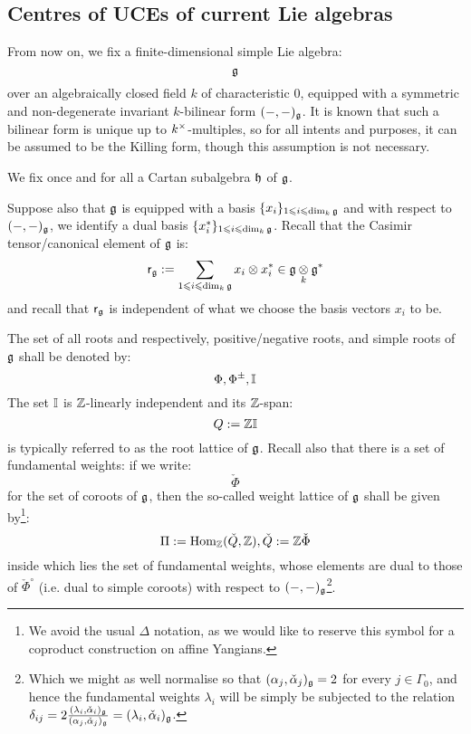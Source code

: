     \subsection{Centres of UCEs of current Lie algebras}
        \begin{convention} \label{conv: a_fixed_finite_dimensional_simple_lie_algebra}
            From now on, we fix a finite-dimensional simple Lie algebra:
                $$\mathfrak{g}$$
            over an algebraically closed field $k$ of characteristic $0$, equipped with a symmetric and non-degenerate invariant $k$-bilinear form $(-, -)_{\mathfrak{g}}$. It is known that such a bilinear form is unique up to $k^{\x}$-multiples, so for all intents and purposes, it can be assumed to be the Killing form, though this assumption is not necessary. 

            We fix once and for all a Cartan subalgebra $\mathfrak{h}$ of $\mathfrak{g}$. 
    
            Suppose also that $\mathfrak{g}$ is equipped with a basis $\{x_i\}_{1 \leqslant i \leqslant \dim_k \mathfrak{g}}$ and with respect to $(-, -)_{\mathfrak{g}}$, we identify a dual basis $\{x_i^*\}_{1 \leqslant i \leqslant \dim_k \mathfrak{g}}$. Recall that the Casimir tensor/canonical element of $\mathfrak{g}$ is:
                $$\sfr_{\g} := \sum_{1 \leq i \leq \dim_k \g} x_i \tensor x_i^* \in \g \tensor_k \g^*$$
            and recall that $\mathsf{r}_{\mathfrak{g}}$ is independent of what we choose the basis vectors $x_i$ to be.
    
            The set of all roots and respectively, positive/negative roots, and simple roots of $\mathfrak{g}$ shall be denoted by:
                $$\Phi, \Phi^{\pm}, \mathbb{I}$$
            The set $\mathbb{I}$ is $\mathbb{Z}$-linearly independent and its $\mathbb{Z}$-span:
                $$Q := \mathbb{Z} \mathbb{I}$$
            is typically referred to as the root lattice of $\mathfrak{g}$. Recall also that there is a set of fundamental weights: if we write:
                $$\check{\Phi}$$
            for the set of coroots of $\mathfrak{g}$, then the so-called weight lattice of $\mathfrak{g}$ shall be given by\footnote{We avoid the usual $\Delta$ notation, as we would like to reserve this symbol for a coproduct construction on affine Yangians.}:
                $$\Pi := \mathrm{Hom}_{\mathbb{Z}}(\check{Q}, \mathbb{Z}), \check{Q} := \mathbb{Z}\check{\Phi}$$
            inside which lies the set of fundamental weights, whose elements are dual to those of $\check{\Phi}^{\circ}$ (i.e. dual to simple coroots) with respect to $(-, -)_{\mathfrak{g}}$\footnote{Which we might as well normalise so that $(\alpha_j, \check{\alpha}_j)_{\mathfrak{g}} = 2$ for every $j \in \Gamma_0$, and hence the fundamental weights $\lambda_i$ will be simply be subjected to the relation $\delta_{ij} = 2 \frac{(\lambda_i, \check{\alpha}_i)_{\mathfrak{g}}}{(\alpha_j, \check{\alpha}_j)_{\mathfrak{g}}} = (\lambda_i, \check{\alpha}_i)_{\mathfrak{g}}$.}.
        \end{convention}

